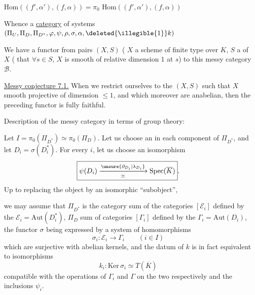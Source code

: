 $\mathrm{Hom}((f',\alpha'),(f,\alpha))=\pi_0$
\uline{$\mathrm{Hom}$}$((f',\alpha'),(f,\alpha))$

Whence a \uline{category} of
 systems
$(\Pi_U,\Pi_D,\Pi_{D^*},\varphi,\psi,\rho,\sigma,\alpha,
\deleted{\illegible{1}}k)$


We have a functor from pairs $(X,S)$
( $X$ a scheme  of finite type over $K$,
$S$ a 
  of $X$
 ( that $\forall s\in S$, $X$
is smooth of relative dimension $1$ at $s$)
to this messy category $\mathcal B$.


\uline{Messy conjecture 7.1.}
When we restrict ourselves to the $(X,S)$ such that $X$ smooth projective of dimension
$\leq 1$, and which moreover are anabelian, then the
preceding functor is fully faithful.


Description of the messy category in terms of group theory:

Let $I=\pi_0(\Pi_{D^*})\simeq\pi_0(\Pi_D)$.
Let us choose an   in each component of
$\Pi_{D^*}$, and let $D_i=\sigma(D_i^*)$.
For every $i$, let us choose an isomorphism
\[
\boxed{\psi(D_i)\xrightarrow[\simeq]{\unsure{\partial_{D_i}|\lambda_{D_i}}}
\mathrm{Spec}(\overline K)}.
\]
Up to replacing the object by an isomorphic ``subobject'',


we may assume that $\Pi_{D^*}$ is the category sum of the categories
$[\mathcal E_i]$ defined by the
$\mathcal E_i=\mathrm{Aut}(D_i^*)$, $\Pi_D$
 
sum of categories $[\Gamma_i]$ defined by the
$\Gamma_i=\mathrm{Aut}(D_i)$, the functor $\sigma$ being expressed
by a system of homomorphisms
\[
\sigma_i:\mathcal E_i\to\Gamma_i\qquad(i\in I)
\]
which are surjective with abelian kernels,
and the datum of $k$ is in fact equivalent to isomorphisms
\[
k_i:\mathrm{Ker}\,\sigma_i\simeq T(\overline K)
\]
compatible with the operations of $\Gamma_i$ and $\Gamma$ on the two
 respectively and the inclusions $\psi_i$.

